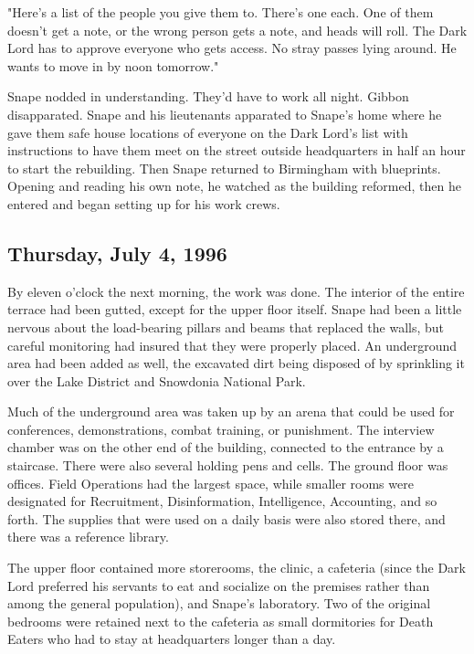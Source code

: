 \documentclass[a4paper,11pt]{article}
\begin{document}
"Here's a list of the people you give them to. There's one each. One of them doesn't get a note, or the wrong person gets a note, and heads will roll. The Dark Lord has to approve everyone who gets access. No stray passes lying around. He wants to move in by noon tomorrow."

Snape nodded in understanding. They'd have to work all night. Gibbon disapparated. Snape and his lieutenants apparated to Snape's home where he gave them safe house locations of everyone on the Dark Lord's list with instructions to have them meet on the street outside headquarters in half an hour to start the rebuilding. Then Snape returned to Birmingham with blueprints. Opening and reading his own note, he watched as the building reformed, then he entered and began setting up for his work crews.

\subsection{Thursday, July 4, 1996}

By eleven o'clock the next morning, the work was done. The interior of the entire terrace had been gutted, except for the upper floor itself. Snape had been a little nervous about the load-bearing pillars and beams that replaced the walls, but careful monitoring had insured that they were properly placed. An underground area had been added as well, the excavated dirt being disposed of by sprinkling it over the Lake District and Snowdonia National Park.

Much of the underground area was taken up by an arena that could be used for conferences, demonstrations, combat training, or punishment. The interview chamber was on the other end of the building, connected to the entrance by a staircase. There were also several holding pens and cells. The ground floor was offices. Field Operations had the largest space, while smaller rooms were designated for Recruitment, Disinformation, Intelligence, Accounting, and so forth. The supplies that were used on a daily basis were also stored there, and there was a reference library.

The upper floor contained more storerooms, the clinic, a cafeteria (since the Dark Lord preferred his servants to eat and socialize on the premises rather than among the general population), and Snape's laboratory. Two of the original bedrooms were retained next to the cafeteria as small dormitories for Death Eaters who had to stay at headquarters longer than a day.
\end{document}
